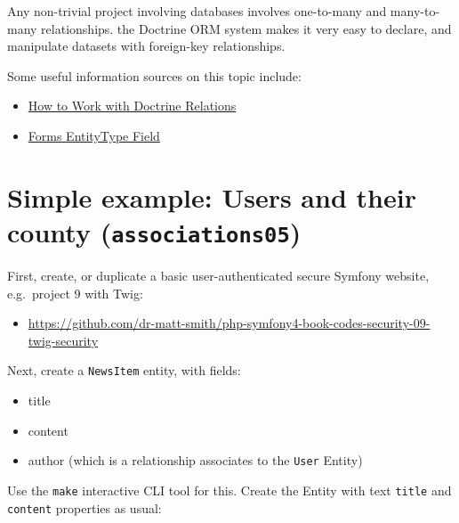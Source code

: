 \documentclass[a4paperpaper,openright]{book}
\providecommand{\tightlist}{%
  \setlength{\itemsep}{0pt}\setlength{\parskip}{0pt}}
\begin{document}
Any non-trivial project involving databases involves one-to-many and
many-to-many relationships. the Doctrine ORM system makes it very easy
to declare, and manipulate datasets with foreign-key relationships.

Some useful information sources on this topic include:

\begin{itemize}
\item
  \href{http://symfony.com/doc/current/doctrine/associations.html}{How
  to Work with Doctrine Relations}
\item
  \href{http://symfony.com/doc/current/reference/forms/types/entity.html}{Forms
  EntityType Field}
\end{itemize}

\hypertarget{simple-example-users-and-their-county-associations05}{%
\section{\texorpdfstring{Simple example: Users and their county
(\texttt{associations05})}{Simple example: Users and their county (associations05)}}\label{simple-example-users-and-their-county-associations05}}

First, create, or duplicate a basic user-authenticated secure Symfony
website, e.g.~project 9 with Twig:

\begin{itemize}
\tightlist
\item
  \url{https://github.com/dr-matt-smith/php-symfony4-book-codes-security-09-twig-security}
\end{itemize}

Next, create a \texttt{NewsItem} entity, with fields:

\begin{itemize}
\item
  title
\item
  content
\item
  author (which is a relationship associates to the \texttt{User}
  Entity)
\end{itemize}

Use the \texttt{make} interactive CLI tool for this. Create the Entity
with text \texttt{title} and \texttt{content} properties as usual:
\end{document}
